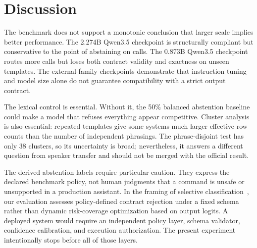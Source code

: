 \documentclass[12pt]{article}
\begin{document}
\section{Discussion}

The benchmark does not support a monotonic conclusion that larger scale implies better performance. The 2.274B Qwen3.5 checkpoint is structurally compliant but conservative to the point of abstaining on calls. The 0.873B Qwen3.5 checkpoint routes more calls but loses both contract validity and exactness on unseen templates. The external-family checkpoints demonstrate that instruction tuning and model size alone do not guarantee compatibility with a strict output contract.

The lexical control is essential. Without it, the 50\% balanced abstention baseline could make a model that refuses everything appear competitive. Cluster analysis is also essential: repeated templates give some systems much larger effective row counts than the number of independent phrasings. The phrase-disjoint test has only 38 clusters, so its uncertainty is broad; nevertheless, it answers a different question from speaker transfer and should not be merged with the official result.

The derived abstention labels require particular caution. They express the declared benchmark policy, not human judgments that a command is unsafe or unsupported in a production assistant. In the framing of selective classification~\cite{geifman2017selective}, our evaluation assesses policy-defined contract rejection under a fixed schema rather than dynamic risk-coverage optimization based on output logits. A deployed system would require an independent policy layer, schema validator, confidence calibration, and execution authorization. The present experiment intentionally stops before all of those layers.
\end{document}
